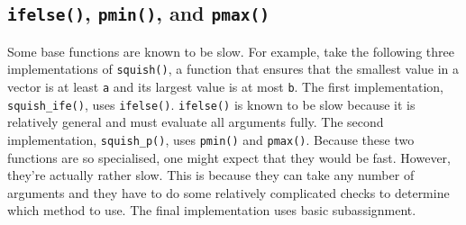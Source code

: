 \subsection{\texttt{ifelse()}, \texttt{pmin()}, and \texttt{pmax()}}

Some base functions are known to be slow. For example, take the
following three implementations of \texttt{squish()}, a function that
ensures that the smallest value in a vector is at least \texttt{a} and
its largest value is at most \texttt{b}. The first implementation,
\texttt{squish\_ife()}, uses \texttt{ifelse()}. \texttt{ifelse()} is
known to be slow because it is relatively general and must evaluate all
arguments fully. The second implementation, \texttt{squish\_p()}, uses
\texttt{pmin()} and \texttt{pmax()}. Because these two functions are so
specialised, one might expect that they would be fast. However, they're
actually rather slow. This is because they can take any number of
arguments and they have to do some relatively complicated checks to
determine which method to use. The final implementation uses basic
subassignment.   

\begin{Shaded}
\begin{Highlighting}[]
\StringTok{ }
  \StringTok{ }\StringTok{ }
\NormalTok{\}}
\StringTok{ }
  \NormalTok{(}
\NormalTok{\}}
\StringTok{ }
  \NormalTok{x[x <=}\StringTok{ }\NormalTok{a] <-}\StringTok{ }
  \NormalTok{x[x >=}\StringTok{ }\NormalTok{b] <-}\StringTok{ }
\NormalTok{\}}

\StringTok{ }\NormalTok{(}\NormalTok{, -}\NormalTok{, }\NormalTok{)}
\NormalTok{(}
   \NormalTok{, }\NormalTok{),}
   \NormalTok{, }\NormalTok{),}
   \NormalTok{, }\NormalTok{),}
   
\NormalTok{)}
\end{Highlighting}
\end{Shaded}

